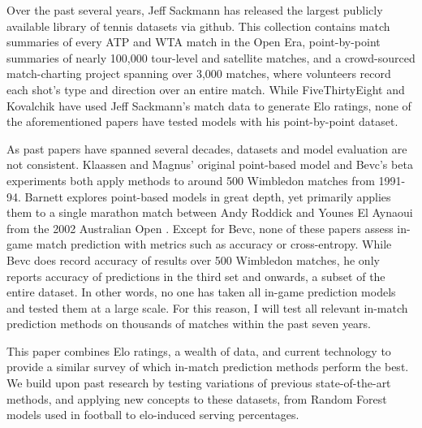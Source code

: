 \documentclass[chapterprefix=false]{report}
\begin{document}
Over the past several years, Jeff Sackmann has released the largest publicly available library of tennis datasets via github. This collection contains match summaries of every ATP and WTA match in the Open Era, point-by-point summaries of nearly 100,000 tour-level and satellite matches, and a crowd-sourced match-charting project spanning over 3,000 matches, where volunteers record each shot's type and direction over an entire match. While FiveThirtyEight and Kovalchik have used Jeff Sackmann’s match data to generate Elo ratings, none of the aforementioned papers have tested models with his point-by-point dataset.

As past papers have spanned several decades, datasets and model evaluation are not consistent. Klaassen and Magnus' original point-based model and Bevc's beta experiments both apply methods to around 500 Wimbledon matches from 1991-94. Barnett explores point-based models in great depth, yet primarily applies them to a single marathon match between Andy Roddick and Younes El Aynaoui from the 2002 Australian Open \citep{Barnett2006}. Except for Bevc, none of these papers assess in-game match prediction with metrics such as accuracy or cross-entropy. While Bevc does record accuracy of results over 500 Wimbledon matches, he only reports accuracy of predictions in the third set and onwards, a subset of the entire dataset. In other words, no one has taken all in-game prediction models and tested them at a large scale. For this reason, I will test all relevant in-match prediction methods on thousands of matches within the past seven years.


This paper combines Elo ratings, a wealth of data, and current technology to provide a similar survey of which in-match prediction methods perform the best. We build upon past research by testing variations of previous state-of-the-art methods, and applying new concepts to these datasets, from Random Forest models used in football to elo-induced serving percentages.
 
\end{document}
